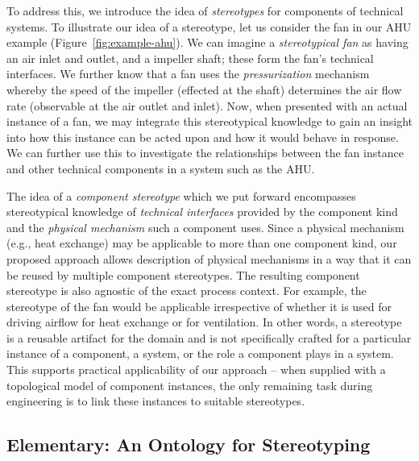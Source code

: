 \documentclass[sigconf]{acmart}
\begin{document}
To address this, we introduce the idea of \textit{stereotypes} for components of technical systems.
%
To illustrate our idea of a stereotype, let us consider the fan in our AHU example (Figure~\ref{fig:example-ahu}).
We can imagine a \textit{stereotypical fan} as having an air inlet and outlet, and a impeller shaft; these form the fan's technical interfaces.
We further know that a fan uses the \textit{pressurization} mechanism whereby the speed of the impeller (effected at the shaft) determines the air flow rate (observable at the air outlet and inlet).
%
Now, when presented with an actual instance of a fan, we may integrate this stereotypical knowledge to gain an insight into how this instance can be acted upon and how it would behave in response. We can further use this to investigate the relationships between the fan instance and other technical components in a system such as the AHU.

The idea of a \textit{component stereotype} which we put forward encompasses stereotypical knowledge of \textit{technical interfaces} provided by the component kind and the \textit{physical mechanism} such a component uses.
Since a physical mechanism (e.g., heat exchange) may be applicable to more than one component kind, our proposed approach allows description of physical mechanisms in a way that it can be reused by multiple component stereotypes.
%
The resulting component stereotype is also agnostic of the exact process context.
For example, the stereotype of the fan would be applicable irrespective of whether it is used for driving airflow for heat exchange or for ventilation.
In other words, a stereotype is a reusable artifact for the domain and is not specifically crafted for a particular instance of a component, a system, or the role a component plays in a system.
This supports practical applicability of our approach -- when supplied with a topological model of component instances, the only remaining task during engineering is to link these instances to suitable stereotypes.


\subsection{Elementary: An Ontology for Stereotyping}
\end{document}
